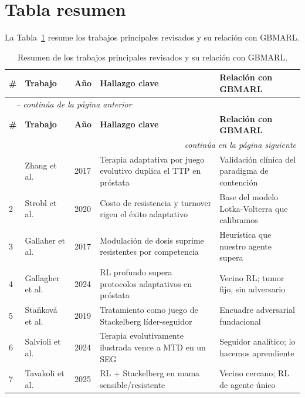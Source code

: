 \section{Tabla resumen}
\label{sec:tabla-resumen}

La Tabla~\ref{tab:related-work} resume los trabajos principales revisados y su relación con GBMARL.

{\footnotesize
\renewcommand{\arraystretch}{1.25}
\begin{longtable}{@{}p{0.4cm}p{2.7cm}p{0.7cm}p{3.3cm}p{3.9cm}@{}}
\caption{Resumen de los trabajos principales revisados y su relación con GBMARL.}
\label{tab:related-work}\\
\hline
\textbf{\#} & \textbf{Trabajo} & \textbf{Año} & \textbf{Hallazgo clave} & \textbf{Relación con GBMARL} \\
\hline
\endfirsthead
\multicolumn{5}{l}{\textit{\tablename~\thetable{} -- continúa de la página anterior}}\\
\hline
\textbf{\#} & \textbf{Trabajo} & \textbf{Año} & \textbf{Hallazgo clave} & \textbf{Relación con GBMARL} \\
\hline
\endhead
\hline
\multicolumn{5}{r}{\textit{continúa en la página siguiente}}\\
\endfoot
\hline
\endlastfoot
1 & Zhang et al.~\cite{Zhang2017} & 2017 & Terapia adaptativa por juego evolutivo duplica el TTP en próstata & Validación clínica del paradigma de contención \\
2 & Strobl et al.~\cite{Strobl2020} & 2020 & Costo de resistencia y turnover rigen el éxito adaptativo & Base del modelo Lotka-Volterra que calibramos \\
3 & Gallaher et al.~\cite{Gallaher2017} & 2017 & Modulación de dosis suprime resistentes por competencia & Heurística que nuestro agente supera \\
4 & Gallagher et al.~\cite{Gallagher2024} & 2024 & RL profundo supera protocolos adaptativos en próstata & Vecino RL; tumor fijo, sin adversario \\
5 & Staňková et al.~\cite{Stankova2019} & 2019 & Tratamiento como juego de Stackelberg líder-seguidor & Encuadre adversarial fundacional \\
6 & Salvioli et al.~\cite{Salvioli2024} & 2024 & Terapia evolutivamente ilustrada vence a MTD en un SEG & Seguidor analítico; lo hacemos aprendiente \\
7 & Tavakoli et al.~\cite{Tavakoli2025} & 2025 & RL + Stackelberg en mama sensible/resistente & Vecino cercano; RL de agente único \\

\end{longtable}}
